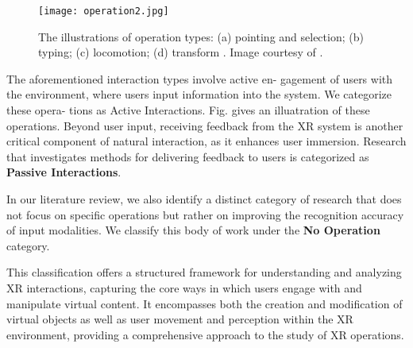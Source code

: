 \documentclass[review]{fcs}
\newcommand{\revise}[2]{\textcolor[rgb]{0,0,0}{#2}}
\begin{document}


\begin{figure}[t]
    \centering
    \texttt{[image: operation2.jpg]}
    \caption{\revise{}{The illustrations of  operation types: (a) pointing and selection; (b) typing; (c) locomotion; (d) transform \cite{DBLP:journals/tvcg/SongDK23}. Image courtesy of \cite{DBLP:journals/tvcg/SongDK23}.}}
    \label{fig:Operation}
\end{figure}

The aforementioned interaction types involve active en-
gagement of users with the environment, where users input
information into the system. We categorize these opera-
tions as Active Interactions. Fig. gives an illuatration of these operations.
Beyond user input, receiving feedback from the XR system is another critical component of natural interaction, as it enhances user immersion. Research that investigates methods for delivering feedback to users is categorized as \textbf{Passive Interactions}.

In our literature review, we also identify a distinct category of research that does not focus on specific operations but rather on improving the recognition accuracy of input modalities. We classify this body of work under the \textbf{No Operation} category.
 
This classification offers a structured framework for understanding and analyzing XR interactions, capturing the core ways in which users engage with and manipulate virtual content. It encompasses both the creation and modification of virtual objects as well as user movement and perception within the XR environment, providing a comprehensive approach to the study of XR operations.
\end{document}
